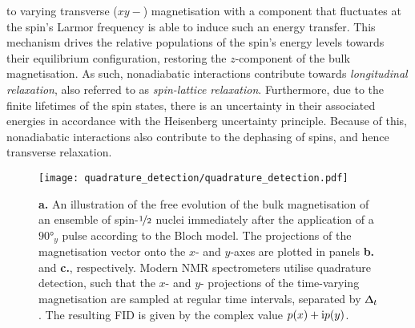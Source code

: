 {\begin{itemize}
            to varying transverse ($xy-$) magnetisation with a component that
            fluctuates at the spin's Larmor frequency is able to induce such an
            energy transfer. This mechanism drives the relative populations of
            the spin's energy levels towards their equilibrium configuration,
            restoring the $z$-component of the bulk magnetisation.
            As such, nonadiabatic interactions contribute towards
            \emph{longitudinal relaxation}, also referred to as
            \emph{spin-lattice relaxation}.
            Furthermore, due to the finite lifetimes of the spin states, there
            is an uncertainty in their associated energies in accordance with
            the Heisenberg uncertainty principle. Because of this, nonadiabatic
            interactions also contribute to the dephasing of spins, and hence
            transverse relaxation.
    \end{itemize}
}


\begin{figure}
    \centering
    \texttt{[image: quadrature\_detection/quadrature\_detection.pdf]}
    \caption[
        An illustration of the free evolution of the bulk
        magnetisation of an ensemble of spin-$\nicefrac{1}{2}$ nuclei
        according to the Bloch model.
    ]{
        \textbf{a.} An illustration of the free evolution of the bulk
        magnetisation of an ensemble of spin-$\nicefrac{1}{2}$ nuclei
        immediately after the application of a $\ang{90}_y$ pulse according to
        the Bloch model.
        The projections of the magnetisation vector onto the
        $x$- and  $y$-axes are plotted in panels \textbf{b.} and \textbf{c.},
        respectively. Modern \acs{NMR} spectrometers utilise quadrature
        detection, such that the $x$- and  $y$- projections of the time-varying
        magnetisation are sampled at regular time intervals, separated by
        $\Updelta_t$.  The resulting \acs{FID} is given by the complex value $p(x) +
        \mathrm{i} p(y)$.
    }\label{fig:quadrature}
\end{figure}

